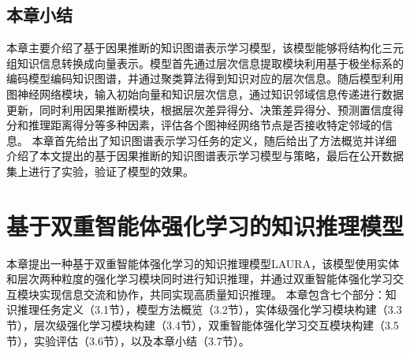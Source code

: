 \documentclass[algorithmlist, AutoFakeBold, AutoFakeSlant, figurelist, tablelist, nomlist, engineering]{seuthesix}
\begin{document}
\section{本章小结}
本章主要介绍了基于因果推断的知识图谱表示学习模型，该模型能够将结构化三元组知识信息转换成向量表示。模型首先通过层次信息提取模块利用基于极坐标系的编码模型编码知识图谱，并通过聚类算法得到知识对应的层次信息。随后模型利用图神经网络模块，输入初始向量和知识层次信息，通过知识邻域信息传递进行数据更新，同时利用因果推断模块，根据层次差异得分、决策差异得分、预测置信度得分和推理距离得分等多种因素，评估各个图神经网络节点是否接收特定邻域的信息。
本章首先给出了知识图谱表示学习任务的定义，随后给出了方法概览并详细介绍了本文提出的基于因果推断的知识图谱表示学习模型与策略，最后在公开数据集上进行了实验，验证了模型的效果。


\chapter{基于双重智能体强化学习的知识推理模型}
本章提出一种基于双重智能体强化学习的知识推理模型LAURA，该模型使用实体和层次两种粒度的强化学习模块同时进行知识推理，并通过双重智能体强化学习交互模块实现信息交流和协作，共同实现高质量知识推理。
本章包含七个部分：知识推理任务定义（3.1节），模型方法概览（3.2节），实体级强化学习模块构建（3.3节），层次级强化学习模块构建（3.4节），双重智能体强化学习交互模块构建（3.5节），实验评估（3.6节），以及本章小结（3.7节）。
\end{document}
